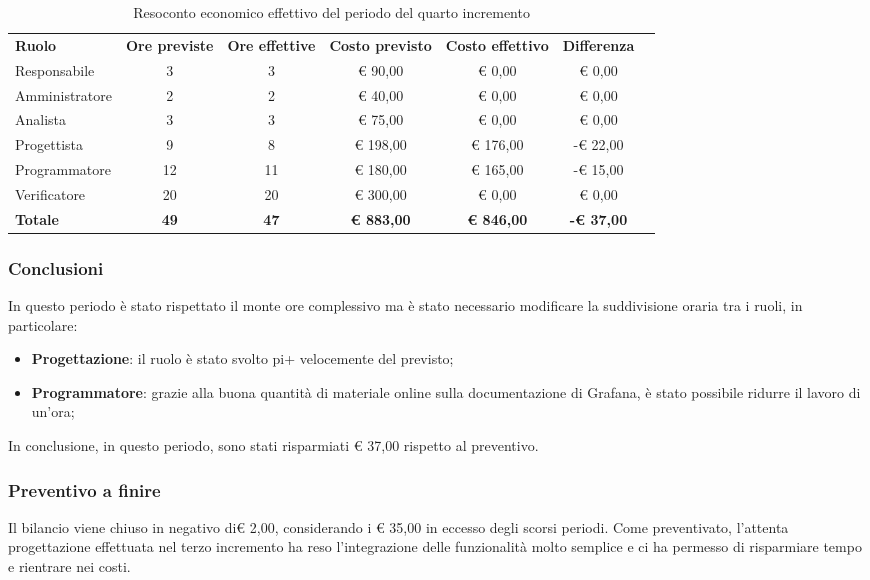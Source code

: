 \documentclass[../piano-di-progetto.tex]{subfiles}
\begin{document}
  \begin{table}[H]
    \centering
    \begin{tabular}{lcccccc}
      \rowcolor{lightgray}
      \textbf{Ruolo}  & \textbf{Ore previste} & \textbf{Ore effettive} & \textbf{Costo previsto} & \textbf{Costo effettivo} & \textbf{Differenza} \\
Responsabile    & 3           & 3           & € 90,00           & € 0,00            & € 0,00            \\
Amministratore  & 2           & 2           & € 40,00           & € 0,00            & € 0,00            \\
Analista        & 3           & 3           & € 75,00           & € 0,00            & € 0,00            \\
Progettista     & 9           & 8           & € 198,00          & € 176,00          & -€ 22,00          \\
Programmatore   & 12          & 11          & € 180,00          & € 165,00          & -€ 15,00          \\
Verificatore    & 20          & 20          & € 300,00          & € 0,00            & € 0,00            \\
\textbf{Totale} & \textbf{49} & \textbf{47} & \textbf{€ 883,00} & \textbf{€ 846,00} & \textbf{-€ 37,00}

    \end{tabular}
    \caption{Resoconto economico effettivo del periodo del quarto incremento}
  \end{table}


\subsubsection{Conclusioni}
In questo periodo è stato rispettato il monte ore complessivo ma è stato necessario modificare la suddivisione oraria tra i ruoli, in particolare:
\begin{itemize}
    \item \textbf{Progettazione}: il ruolo è stato svolto pi+ velocemente del previsto;
    \item \textbf{Programmatore}: grazie alla buona quantità di materiale online sulla documentazione di Grafana, è stato possibile ridurre il lavoro di un'ora;
\end{itemize}
In conclusione, in questo periodo, sono stati risparmiati € 37,00 rispetto al preventivo.

\subsubsection{Preventivo a finire}
Il bilancio viene chiuso in negativo di€ 2,00, considerando i € 35,00 in eccesso degli scorsi periodi. Come preventivato, l'attenta progettazione effettuata nel terzo incremento ha reso l'integrazione delle funzionalità molto semplice e ci ha permesso di risparmiare tempo e rientrare nei costi. 
\end{document}
